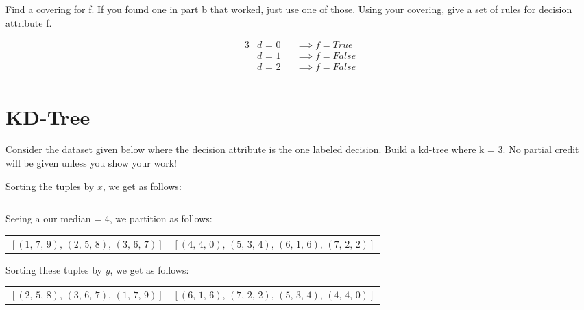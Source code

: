 \documentclass[12pt]{scrartcl}
\begin{document}
\begin{statement}
    Find a covering for f. If you found one in part b that worked, just use one of those. Using your covering, give a set of rules for decision attribute f.
\end{statement}
\begin{alignat*}{3}
    &\text{$d$ = 0}  &&\implies \text{$f = True$} \\
    &\text{$d$ = 1}  &&\implies \text{$f = False$} \\
    &\text{$d$ = 2}  &&\implies \text{$f = False$} \\
\end{alignat*}

\section{KD-Tree}
\begin{statement}
    Consider the dataset given below where the decision attribute is the one labeled decision. Build a kd-tree where k = 3. No partial credit will be given unless you show your work!
\end{statement}
\small
Sorting the tuples by $x$, we get as follows:

\begin{equation*}
    [(1,\, 7,\, 9),\, (2,\, 5,\, 8),\, (3,\, 6,\, 7),\, (4,\, 4,\, 0),\, (5,\, 3,\, 4),\, (6,\, 1,\, 6),\, (7,\, 2,\, 2)]
\end{equation*}

Seeing a our median = $4$, we partition as follows:

\begin{table}[H]
    \centering
    \begin{tabular}{cc}
        $[(1,\, 7,\, 9),\, (2,\, 5,\, 8),\, (3,\, 6,\, 7)]$ & $[(4,\, 4,\, 0),\, (5,\, 3,\, 4),\, (6,\, 1,\, 6),\, (7,\, 2,\, 2)]$
    \end{tabular}
\end{table}

Sorting these tuples by $y$, we get as follows:

\begin{table}[H]
    \centering
    \begin{tabular}{ll}
        $[(2,\, 5,\, 8),\, (3,\, 6,\, 7),\, (1,\, 7,\, 9)]$ & $[(6,\, 1,\, 6),\, (7,\, 2,\, 2),\, (5,\, 3,\, 4),\, (4,\, 4,\, 0)]$ \\
    \end{tabular}
\end{table}
\end{document}
